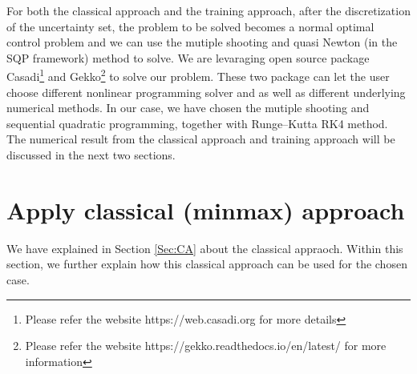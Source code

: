 \documentclass  [
  paper    = a4,
  BCOR     = 10mm,
  twoside,
  fontsize = 12pt,
  fleqn,
  toc      = bibnumbered,
  toc      = listofnumbered,
  numbers  = noendperiod,
  headings = normal,
  listof   = leveldown,
  version  = 3.03
]                                       {scrreprt}
\newcommand{\<}{\langle}
\renewcommand{\>}{\rangle}
\begin{document}
For both the classical approach and the training approach, after the discretization of the uncertainty set, the problem to be solved becomes a normal optimal control problem and we can use the mutiple shooting and quasi Newton (in the SQP framework) method to solve. We are levaraging open source package Casadi\footnote{Please refer the website https://web.casadi.org for more details} and Gekko\footnote{Please refer the website https://gekko.readthedocs.io/en/latest/ for more information} to solve our problem. These two package can let the user choose different nonlinear programming solver and as well as different underlying numerical methods. In our case, we have chosen the mutiple shooting and sequential quadratic programming, together with Runge–Kutta RK4 method. The numerical result from the classical approach and training approach will be discussed in the next two sections. 

\section{Apply classical (minmax) approach}
We have explained in Section \ref{Sec:CA} about the classical appraoch. Within this section, we further explain how this classical approach can be used for the chosen case. 
\end{document}

